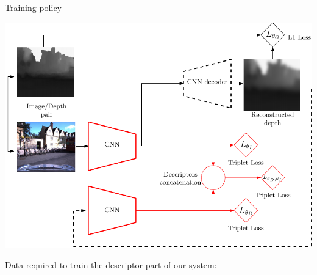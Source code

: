 \begin{frame}{Training policy}
	\only<1>
	{
	\begin{minipage}{0.6\linewidth}
		\centering
		\includegraphics[width=\linewidth]{vect/method/fig3/5}	
	\end{minipage}\hfill
	\begin{minipage}{0.3\linewidth}
		\raggedright
		Data required to train the descriptor part of our system:
		\vspace{0.5cm}
		

\end{minipage}}
\end{frame}
